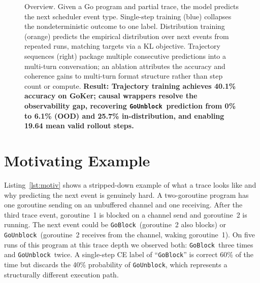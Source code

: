 \documentclass[10pt,conference]{IEEEtran}
\newcommand{\eblock}{\texttt{GoBlock}}
\newcommand{\eunblock}{\texttt{GoUnblock}}
\begin{document}
\begin{figure}[t]
{}
\caption{Overview. Given a Go program and partial trace, the model
predicts the next scheduler event type. Single-step training (blue)
collapses the nondeterministic outcome to one label.
Distribution training (orange) predicts the empirical distribution
over next events from repeated runs, matching targets via a KL objective.
Trajectory sequences (right) package multiple consecutive predictions
into a multi-turn conversation; an ablation attributes the accuracy and
coherence gains to multi-turn format structure rather than step count
or compute.
\textbf{Result: Trajectory training achieves 40.1\% accuracy on GoKer; causal wrappers resolve the observability gap, recovering \eunblock\ prediction from 0\% to 6.1\% (OOD) and 25.7\% in-distribution, and enabling 19.64 mean valid rollout steps.}}
\label{fig:teaser}
\end{figure}

\section{Motivating Example}\label{sec:motivating}

Listing~\ref{lst:motiv} shows a stripped-down example of what a trace
looks like and why predicting the next event is genuinely hard.
A two-goroutine program has one goroutine sending on an unbuffered
channel and one receiving.
After the third trace event, goroutine~1 is blocked on a channel send
and goroutine~2 is running.
The next event could be \eblock\ (goroutine~2 also blocks) or
\eunblock\ (goroutine~2 receives from the channel, waking goroutine~1).
On five runs of this program at this trace depth we observed both:
\eblock\ three times and \eunblock\ twice.
A single-step CE label of ``\eblock'' is correct 60\% of the time but
discards the 40\% probability of \eunblock, which represents a
structurally different execution path.
\end{document}
